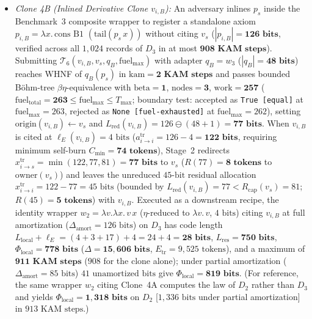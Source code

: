 \documentclass[runningheads,a4paper]{llncs}
\renewcommand{\_}{\textunderscore\allowbreak}
\begin{document}
\begin{enumerate}
\begin{itemize}
    \item \emph{Clone 4B (Inlined Derivative Clone $v_{i,B}$):} An adversary inlines $p_s$ inside the Benchmark~3 composite wrapper to register a standalone axiom $p_{i,B} = \lambda x.\,\text{cons } \text{B1 } (\text{tail}(p_s\,x))$ without citing $v_s$ ($|p_{i,B}| = \mathbf{126\text{ bits}}$, verified across all $1,024$ records of $D_3$ in at most $\mathbf{908\text{ KAM steps}}$). Submitting $\mathcal{T}_6(v_{i,B},\allowbreak v_s,\allowbreak q_B,\allowbreak \text{fuel}_{\max})$ with adapter $q_B = w_3$ ($|q_B| = \mathbf{48\text{ bits}}$) reaches WHNF of $q_B(p_s)$ in $\text{kam} = \mathbf{2\text{ KAM steps}}$ and passes bounded B\"ohm-tree $\beta\eta$-equivalence with $\text{beta} = \mathbf{1}$, $\text{nodes} = \mathbf{3}$, $\text{work} = \mathbf{257}$ ($\text{fuel}_{\text{total}} = \mathbf{263} \le \text{fuel}_{\max} \le T_{\max}$; boundary test: accepted as \texttt{True [equal]} at $\text{fuel}_{\max} = 263$, rejected as \texttt{None [fuel-exhausted]} at $\text{fuel}_{\max} = 262$), setting $\text{origin}(v_{i,B}) \leftarrow v_s$ and $L_{\text{red}}(v_{i,B}) = 126 \ominus (48 + 1) = \mathbf{77\text{ bits}}$. When $v_{i,B}$ is cited at $\ell_E(v_{i,B}) = 4\text{ bits}$ ($a_{i \to i}^{\text{tr}} = 126 - 4 = \mathbf{122\text{ bits}}$, requiring minimum self-burn $C_{\min} = \mathbf{74\text{ tokens}}$), Stage~2 redirects $x_{i \to s}^{\text{tr}} = \min(122,\allowbreak 77,\allowbreak 81) = \mathbf{77\text{ bits}}$ to $v_s$ ($R(77) = \mathbf{8\text{ tokens}}$ to $\text{owner}(v_s)$) and leaves the unreduced $45\text{-bit}$ residual allocation $x_{i \to i}^{\text{tr}} = 122 - 77 = 45\text{ bits}$ (bounded by $L_{\text{red}}(v_{i,B}) = 77 < R_{\text{cap}}(v_s) = 81$; $R(45) = \mathbf{5\text{ tokens}}$) with $v_{i,B}$. Executed as a downstream recipe, the identity wrapper $w_2 = \lambda v.\lambda x.\,v\,x$ ($\eta$-reduced to $\lambda v.\,v$, $4\text{ bits}$) citing $v_{i,B}$ at full amortization ($\Delta_{\text{amort}} = 126\text{ bits}$) on $D_3$ has code length $L_{\text{local}} + \ell_E = (4 + 3 + 17) + 4 = 24 + 4 = \mathbf{28\text{ bits}}$, $L_{\text{res}} = \mathbf{750\text{ bits}}$, $\Phi_{\text{local}} = \mathbf{778\text{ bits}}$ ($\Delta = \mathbf{15,606\text{ bits}}$, $E_{\text{tr}} = 9,525\text{ tokens}$), and a maximum of $\mathbf{911\text{ KAM steps}}$ ($908$ for the clone alone); under partial amortization ($\Delta_{\text{amort}} = 85\text{ bits}$) $41\text{ unamortized bits}$ give $\Phi_{\text{local}} = \mathbf{819\text{ bits}}$. (For reference, the same wrapper $w_2$ citing Clone~4A computes the law of $D_2$ rather than $D_3$ and yields $\Phi_{\text{local}} = \mathbf{1,318\text{ bits}}$ on $D_2$ [$1,336\text{ bits}$ under partial amortization] in $913\text{ KAM steps}$.)

\end{itemize}
\end{enumerate}
\end{document}
